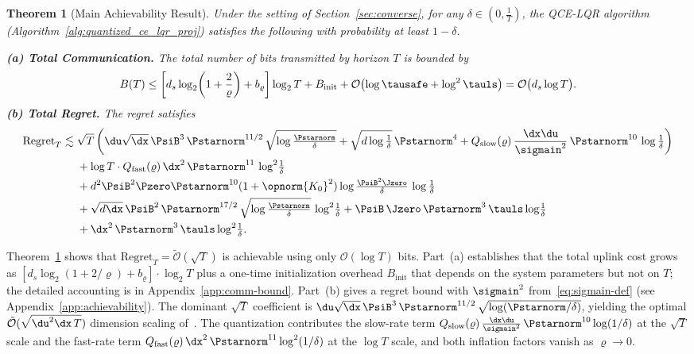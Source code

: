 \documentclass[11pt,journal,onecolumn]{IEEEtran}
\newtheorem{theorem}{Theorem}
\begin{document}
\begin{theorem}[Main Achievability Result]
    \label{thm:main_ach}
    Under the setting of Section~\ref{sec:converse}, for any $\delta \in (0,\frac{1}{T})$, the QCE-LQR algorithm (Algorithm~\ref{alg:quantized_ce_lqr_proj}) satisfies the following with probability at least $1-\delta$.

    \medskip
    \noindent\textbf{(a) Total Communication.} The total number of bits transmitted by horizon $T$ is bounded by
    \begin{equation}
        \label{eq:total-bits}
        B(T) \le \left[ d_s \log_2\!\left(1+\frac{2}{\varrho}\right) + b_\varrho \right] \log_2 T + B_{\mathrm{init}} + \mathcal{O}\!\left(\log \tausafe + \log^2 \tauls\right) = \mathcal{O}\big( d_s \log T \big).
    \end{equation}
    \medskip
    \noindent\textbf{(b) Total Regret.} The regret satisfies
    \begin{align}
        \mathrm{Regret}_T \lesssim \;& \sqrt{T}\left( \du\sqrt{\dx}\,\PsiB^3\,\Pstarnorm^{11/2}\,\sqrt{\log\tfrac{\Pstarnorm}{\delta}} + \sqrt{d\log\tfrac{1}{\delta}}\,\Pstarnorm^4 + Q_{\mathrm{slow}}(\varrho)\,\frac{\dx\du}{\sigmain^2}\,\Pstarnorm^{10}\,\log\tfrac{1}{\delta} \right) \label{eq:regret-dominant} \\
        & + \log T \cdot Q_{\mathrm{fast}}(\varrho)\,\dx^2\,\Pstarnorm^{11}\,\log^2\!\tfrac{1}{\delta} \nonumber \\
        & +  d^2 \PsiB^2 \Pzero \Pstarnorm^{10} (1+\opnorm{K_0}^2) \log \tfrac{\PsiB^2 \Jzero}{\delta}\, \log \tfrac{1}{\delta} \nonumber \\
        & + \sqrt{d\dx}\,\PsiB^2\,\Pstarnorm^{17/2}\,\sqrt{\log\tfrac{\Pstarnorm}{\delta}}\,\log^2\!\tfrac{1}{\delta} + \PsiB\,\Jzero\,\Pstarnorm^3\, \tauls \log\!\tfrac{1}{\delta} \nonumber \\
        & + \dx^2\, \Pstarnorm^3\, \tauls \log^2\!\tfrac{1}{\delta}. \nonumber
    \end{align}
\end{theorem}

Theorem~\ref{thm:main_ach} shows that $\mathrm{Regret}_T = \tilde{\mathcal{O}}(\sqrt{T})$ is achievable using only $\mathcal{O}(\log T)$ bits. Part~(a) establishes that the total uplink cost grows as $[d_s \log_2(1 + 2/\varrho) + b_\varrho] \cdot \log_2 T$ plus a one-time initialization overhead $B_{\mathrm{init}}$ that depends on the system parameters but not on $T$; the detailed accounting is in Appendix~\ref{app:comm-bound}. Part~(b) gives a regret bound with $\sigmain^2$ from~\eqref{eq:sigmain-def} (see Appendix~\ref{app:achievability}). The dominant $\sqrt{T}$ coefficient is $\du\sqrt{\dx}\,\PsiB^3\,\Pstarnorm^{11/2}\,\sqrt{\log(\Pstarnorm/\delta)}$, yielding the optimal $\tilde{\mathcal{O}}(\sqrt{\du^2\dx\,T})$ dimension scaling of~\cite{simchowitz20a}. The quantization contributes the slow-rate term $Q_{\mathrm{slow}}(\varrho)\,\frac{\dx\du}{\sigmain^2}\,\Pstarnorm^{10}\log(1/\delta)$ at the $\sqrt{T}$ scale and the fast-rate term $Q_{\mathrm{fast}}(\varrho)\,\dx^2\,\Pstarnorm^{11}\log^2(1/\delta)$ at the $\log T$ scale, and both inflation factors vanish as $\varrho \to 0$.
\end{document}
